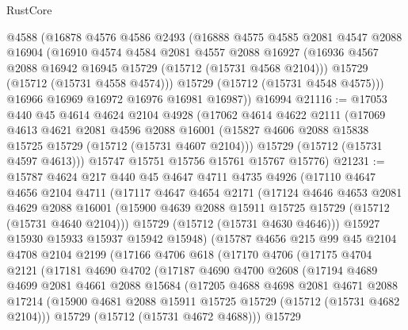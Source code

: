 \begin{lexlean}{RustCore}
\begin{coremodule}
      @4588
      (@16878
        @4576
        @4586
        @2493
        (@16888
          @4575
          @4585
          @2081
          @4547
          @2088
          @16904
          (@16910
            @4574
            @4584
            @2081
            @4557
            @2088
            @16927
            (@16936 @4567 @2088 @16942 @16945 @15729 (@15712 (@15731 @4568 @2104)))
            @15729
            (@15712 (@15731 @4558 @4574)))
          @15729
          (@15712 (@15731 @4548 @4575)))
        @16966
        @16969
        @16972
        @16976
        @16981
        @16987))
    @16994
@21116 := @17053
    @440
    @45
    @4614
    @4624
    @2104
    @4928
    (@17062
      @4614
      @4622
      @2111
      (@17069
        @4613
        @4621
        @2081
        @4596
        @2088
        @16001
        (@15827 @4606 @2088 @15838 @15725 @15729 (@15712 (@15731 @4607 @2104)))
        @15729
        (@15712 (@15731 @4597 @4613)))
      @15747
      @15751
      @15756
      @15761
      @15767
      @15776)
@21231 := @15787
    @4624
    @217
    @440
    @45
    @4647
    @4711
    @4735
    @4926
    (@17110
      @4647
      @4656
      @2104
      @4711
      (@17117
        @4647
        @4654
        @2171
        (@17124
          @4646
          @4653
          @2081
          @4629
          @2088
          @16001
          (@15900 @4639 @2088 @15911 @15725 @15729 (@15712 (@15731 @4640 @2104)))
          @15729
          (@15712 (@15731 @4630 @4646)))
        @15927
        @15930
        @15933
        @15937
        @15942
        @15948)
      (@15787
        @4656
        @215
        @99
        @45
        @2104
        @4708
        @2104
        @2199
        (@17166
          @4706
          @618
          (@17170
            @4706
            (@17175
              @4704
              @2121
              (@17181
                @4690
                @4702
                (@17187
                  @4690
                  @4700
                  @2608
                  (@17194
                    @4689
                    @4699
                    @2081
                    @4661
                    @2088
                    @15684
                    (@17205
                      @4688
                      @4698
                      @2081
                      @4671
                      @2088
                      @17214
                      (@15900 @4681 @2088 @15911 @15725 @15729 (@15712 (@15731 @4682 @2104)))
                      @15729
                      (@15712 (@15731 @4672 @4688)))
                    @15729

\end{coremodule}
\end{lexlean}
